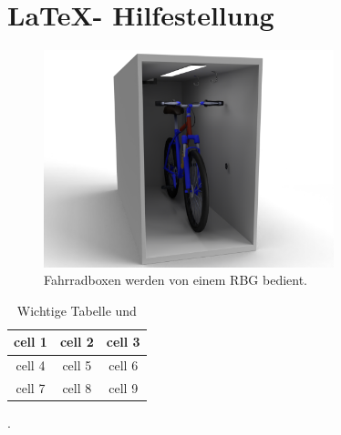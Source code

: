 \section{\LaTeX - Hilfestellung}

\begin{figure}[h]
  \centering
  \includegraphics[width=0.75\textwidth]{images/test}
  \caption{Fahrradboxen werden von einem \ac{RBG} bedient.}
  \label{fig:fahrrad_box}
\end{figure}

\begin{table}[h]
  \begin{center}
    \begin{tabular} { |c|c|c| }
      \hline
      cell 1 & cell 2 & cell 3 \\
      \hline
      cell 4 & cell 5 & cell 6 \\
      cell 7 & cell 8 & cell 9 \\
      \hline
    \end{tabular}
    \caption{Wichtige Tabelle \cite{testbook:aaaa} und \cite{stackoverflow}}.
    \label{tab:wichtige_tabelle}
  \end{center}
\end{table}
